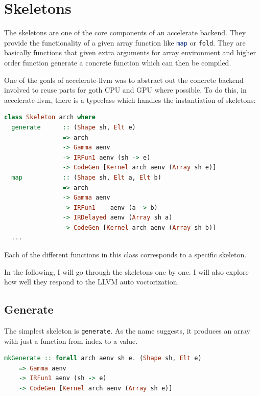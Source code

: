 \documentclass[a4paper,bibliography=totocnumbered,parskip,headsepline]{scrbook}
\begin{document}
\chapter{Skeletons}
The skeletons are one of the core components of an accelerate backend.
They provide the functionality of a given array function like \lstinline[language=haskell]!map! or \lstinline[language=haskell,morekeywords={fold}]!fold!.
They are basically functions that given extra arguments for array environment and higher order function generate a concrete function which can then be compiled.

One of the goals of accelerate-llvm was to abstract out the concrete backend involved to reuse parts for goth CPU and GPU where possible.
To do this, in accelerate-llvm, there is a typeclass which handles the instantiation of skeletons:
\begin{lstlisting}[language=haskell]
class Skeleton arch where
  generate      :: (Shape sh, Elt e)
                => arch
                -> Gamma aenv
                -> IRFun1 aenv (sh -> e)
                -> CodeGen [Kernel arch aenv (Array sh e)]
  map           :: (Shape sh, Elt a, Elt b)
                => arch
                -> Gamma aenv
                -> IRFun1    aenv (a -> b)
                -> IRDelayed aenv (Array sh a)
                -> CodeGen [Kernel arch aenv (Array sh b)]
  ...
\end{lstlisting}
Each of the different functions in this class corresponds to a specific skeleton.

In the following, I will go through the skeletons one by one.
I will also explore how well they respond to the LLVM auto voctorization.

\section{Generate}
The simplest skeleton is \lstinline[language=haskell]!generate!.
As the name suggests, it produces an array with just a function from index to a value.

\begin{minipage}{\textwidth}
\begin{lstlisting}[language=haskell]
mkGenerate :: forall arch aenv sh e. (Shape sh, Elt e)
    => Gamma aenv
    -> IRFun1 aenv (sh -> e)
    -> CodeGen [Kernel arch aenv (Array sh e)]
\end{lstlisting}
\end{minipage}
\end{document}
